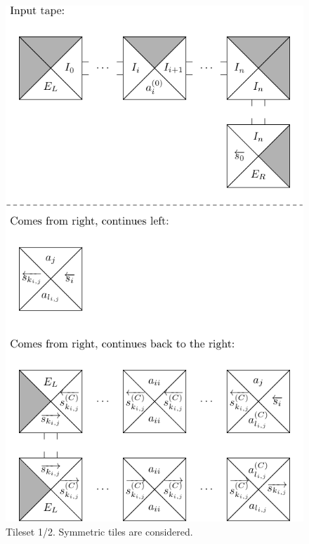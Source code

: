	\begin{figure}[h]
	\begin{center}
		\includegraphics{./figures/tiles1.pdf}
		\caption{Tileset 1/2. Symmetric tiles are considered.}
		\label{fig:tileset1}
	\end{center}
	\end{figure}
	
